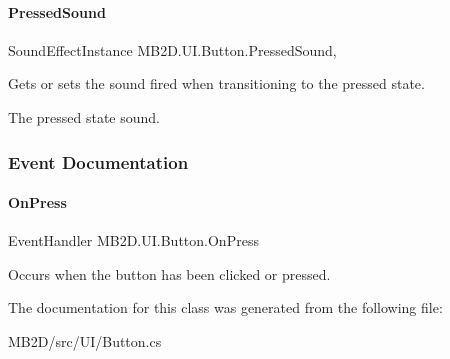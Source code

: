 \paragraph{\texorpdfstring{Pressed\+Sound}{PressedSound}}
{\footnotesize\ttfamily Sound\+Effect\+Instance M\+B2\+D.\+U\+I.\+Button.\+Pressed\+Sound\hspace{0.3cm}{\ttfamily [get]}, {\ttfamily [set]}}



Gets or sets the sound fired when transitioning to the pressed state. 

The pressed state sound.

\subsubsection{Event Documentation}
\hypertarget{class_m_b2_d_1_1_u_i_1_1_button_a280d1c552f9e91c7e63811bc498a4f5e}{}\label{class_m_b2_d_1_1_u_i_1_1_button_a280d1c552f9e91c7e63811bc498a4f5e} 
\paragraph{\texorpdfstring{On\+Press}{OnPress}}
{\footnotesize\ttfamily Event\+Handler M\+B2\+D.\+U\+I.\+Button.\+On\+Press}



Occurs when the button has been clicked or pressed. 



The documentation for this class was generated from the following file\+:\begin{DoxyCompactItemize}
\item 
M\+B2\+D/src/\+U\+I/Button.\+cs\end{DoxyCompactItemize}
